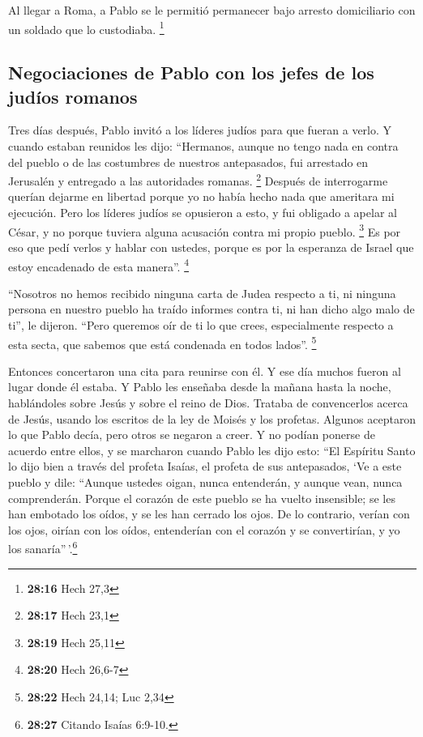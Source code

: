  Al llegar a Roma, a Pablo se le permitió permanecer bajo
arresto domiciliario con un soldado que lo custodiaba. \footnote{\textbf{28:16}
  Hech 27,3}

\hypertarget{negociaciones-de-pablo-con-los-jefes-de-los-juduxedos-romanos}{%
\subsection{Negociaciones de Pablo con los jefes de los judíos
romanos}\label{negociaciones-de-pablo-con-los-jefes-de-los-juduxedos-romanos}}

 Tres días después, Pablo invitó a los líderes judíos
para que fueran a verlo. Y cuando estaban reunidos les dijo: ``Hermanos,
aunque no tengo nada en contra del pueblo o de las costumbres de
nuestros antepasados, fui arrestado en Jerusalén y entregado a las
autoridades romanas. \footnote{\textbf{28:17} Hech 23,1} 
Después de interrogarme querían dejarme en libertad porque yo no había
hecho nada que ameritara mi ejecución.  Pero los líderes
judíos se opusieron a esto, y fui obligado a apelar al César, y no
porque tuviera alguna acusación contra mi propio pueblo. \footnote{\textbf{28:19}
  Hech 25,11}  Es por eso que pedí verlos y hablar con
ustedes, porque es por la esperanza de Israel que estoy encadenado de
esta manera''. \footnote{\textbf{28:20} Hech 26,6-7}

 ``Nosotros no hemos recibido ninguna carta de Judea
respecto a ti, ni ninguna persona en nuestro pueblo ha traído informes
contra ti, ni han dicho algo malo de ti'', le dijeron. 
``Pero queremos oír de ti lo que crees, especialmente respecto a esta
secta, que sabemos que está condenada en todos lados''. \footnote{\textbf{28:22}
  Hech 24,14; Luc 2,34}

 Entonces concertaron una cita para reunirse con él. Y
ese día muchos fueron al lugar donde él estaba. Y Pablo les enseñaba
desde la mañana hasta la noche, hablándoles sobre Jesús y sobre el reino
de Dios. Trataba de convencerlos acerca de Jesús, usando los escritos de
la ley de Moisés y los profetas.  Algunos aceptaron lo
que Pablo decía, pero otros se negaron a creer.  Y no
podían ponerse de acuerdo entre ellos, y se marcharon cuando Pablo les
dijo esto: ``El Espíritu Santo lo dijo bien a través del profeta Isaías,
el profeta de sus antepasados,  `Ve a este pueblo y dile:
``Aunque ustedes oigan, nunca entenderán, y aunque vean, nunca
comprenderán.  Porque el corazón de este pueblo se ha
vuelto insensible; se les han embotado los oídos, y se les han cerrado
los ojos. De lo contrario, verían con los ojos, oirían con los oídos,
entenderían con el corazón y se convertirían, y yo los
sanaría''\,'.\footnote{\textbf{28:27} Citando Isaías 6:9-10.}

